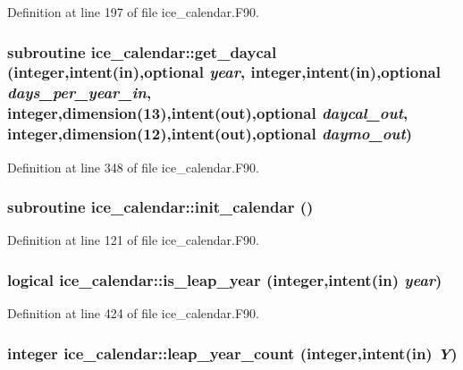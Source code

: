 Definition at line 197 of file ice\_\-calendar.F90.\hypertarget{namespaceice__calendar_a69cff580919f3926456034ebbc574dac}{
\subsubsection[{get\_\-daycal}]{\setlength{\rightskip}{0pt plus 5cm}subroutine ice\_\-calendar::get\_\-daycal (integer,intent(in),optional {\em year}, \/  integer,intent(in),optional {\em days\_\-per\_\-year\_\-in}, \/  integer,dimension(13),intent(out),optional {\em daycal\_\-out}, \/  integer,dimension(12),intent(out),optional {\em daymo\_\-out})}}
\label{namespaceice__calendar_a69cff580919f3926456034ebbc574dac}


Definition at line 348 of file ice\_\-calendar.F90.\hypertarget{namespaceice__calendar_a98202ec2aea2b959f54a058cd7d1387c}{
\subsubsection[{init\_\-calendar}]{\setlength{\rightskip}{0pt plus 5cm}subroutine ice\_\-calendar::init\_\-calendar ()}}
\label{namespaceice__calendar_a98202ec2aea2b959f54a058cd7d1387c}


Definition at line 121 of file ice\_\-calendar.F90.\hypertarget{namespaceice__calendar_a6cc159a7c73375fe57015ddc47dff35e}{
\subsubsection[{is\_\-leap\_\-year}]{\setlength{\rightskip}{0pt plus 5cm}logical ice\_\-calendar::is\_\-leap\_\-year (integer,intent(in) {\em year})}}
\label{namespaceice__calendar_a6cc159a7c73375fe57015ddc47dff35e}


Definition at line 424 of file ice\_\-calendar.F90.\hypertarget{namespaceice__calendar_aabc8501f17759aa61f9a704f13571258}{
\subsubsection[{leap\_\-year\_\-count}]{\setlength{\rightskip}{0pt plus 5cm}integer ice\_\-calendar::leap\_\-year\_\-count (integer,intent(in) {\em Y})}}
\label{namespaceice__calendar_aabc8501f17759aa61f9a704f13571258}


